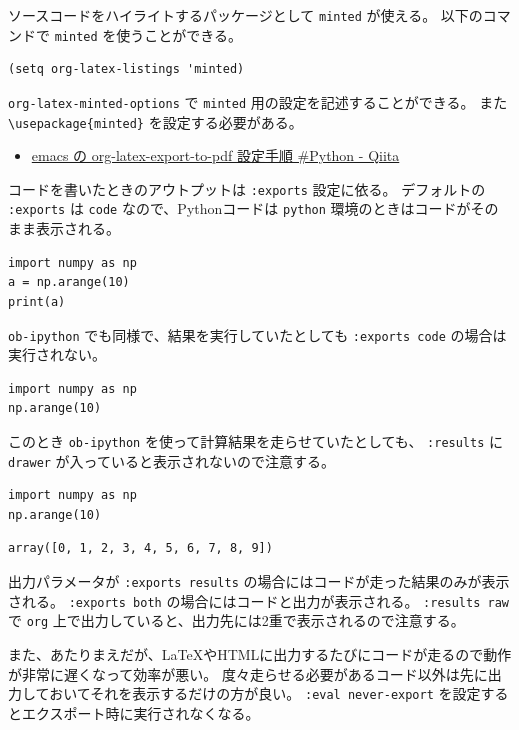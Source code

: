 \documentclass[a4paper, 10pt, notitlepage, uplatex, dvipdfmx]{jsarticle}
\begin{document}
ソースコードをハイライトするパッケージとして \texttt{minted} が使える。
以下のコマンドで \texttt{minted} を使うことができる。
\begin{verbatim}
(setq org-latex-listings 'minted)
\end{verbatim}
\texttt{org-latex-minted-options} で \texttt{minted} 用の設定を記述することができる。
また \texttt{\textbackslash{}usepackage\{minted\}} を設定する必要がある。
\begin{itemize}
\item \href{https://qiita.com/clothoid/items/0a8f825ae19150fe5750}{emacs の org-latex-export-to-pdf 設定手順 \#Python - Qiita}
\end{itemize}

コードを書いたときのアウトプットは \texttt{:exports} 設定に依る。
デフォルトの \texttt{:exports} は \texttt{code} なので、Pythonコードは \texttt{python} 環境のときはコードがそのまま表示される。
\begin{verbatim}
import numpy as np
a = np.arange(10)
print(a)
\end{verbatim}

\texttt{ob-ipython} でも同様で、結果を実行していたとしても \texttt{:exports code} の場合は実行されない。
\begin{verbatim}
import numpy as np
np.arange(10)
\end{verbatim}

このとき \texttt{ob-ipython} を使って計算結果を走らせていたとしても、 \texttt{:results} に \texttt{drawer} が入っていると表示されないので注意する。
\begin{verbatim}
import numpy as np
np.arange(10)
\end{verbatim}

\begin{verbatim}
array([0, 1, 2, 3, 4, 5, 6, 7, 8, 9])
\end{verbatim}


出力パラメータが \texttt{:exports results} の場合にはコードが走った結果のみが表示される。
\texttt{:exports both} の場合にはコードと出力が表示される。
\texttt{:results raw} で \texttt{org} 上で出力していると、出力先には2重で表示されるので注意する。

また、あたりまえだが、\LaTeX{}やHTMLに出力するたびにコードが走るので動作が非常に遅くなって効率が悪い。
度々走らせる必要があるコード以外は先に出力しておいてそれを表示するだけの方が良い。
\texttt{:eval never-export} を設定するとエクスポート時に実行されなくなる。
\end{document}
